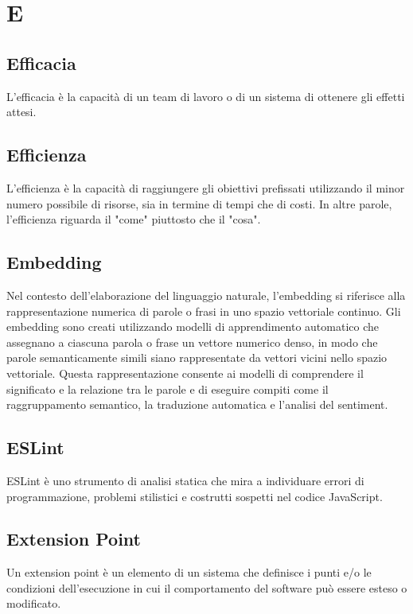 \section{E}

\vspace{2em}
\subsection*{Efficacia}
\par L'efficacia è la capacità di un team di lavoro o di un sistema di ottenere gli effetti attesi.

\vspace{2em}
\subsection*{Efficienza}
\par L'efficienza è la capacità di raggiungere gli obiettivi prefissati utilizzando il minor numero possibile di risorse, sia in termine di tempi che di costi. In altre parole, l'efficienza riguarda il "come" piuttosto che il "cosa".

\vspace{2em}
\subsection*{Embedding}
\par Nel contesto dell'elaborazione del linguaggio naturale, l'embedding si riferisce alla rappresentazione numerica di parole o frasi in uno spazio vettoriale continuo. Gli embedding sono creati utilizzando modelli di apprendimento automatico che assegnano a ciascuna parola o frase un vettore numerico denso, in modo che parole semanticamente simili siano rappresentate da vettori vicini nello spazio vettoriale. Questa rappresentazione consente ai modelli di comprendere il significato e la relazione tra le parole e di eseguire compiti come il raggruppamento semantico, la traduzione automatica e l'analisi del sentiment.

\vspace{2em}
\subsection*{ESLint}
\par ESLint è uno strumento di analisi statica che mira a individuare errori di programmazione, problemi stilistici e costrutti sospetti nel codice JavaScript.

\vspace{2em}
\subsection*{Extension Point}
\par Un extension point è un elemento di un sistema che definisce i punti e/o le condizioni dell'esecuzione in cui il comportamento del software può essere esteso o modificato.
